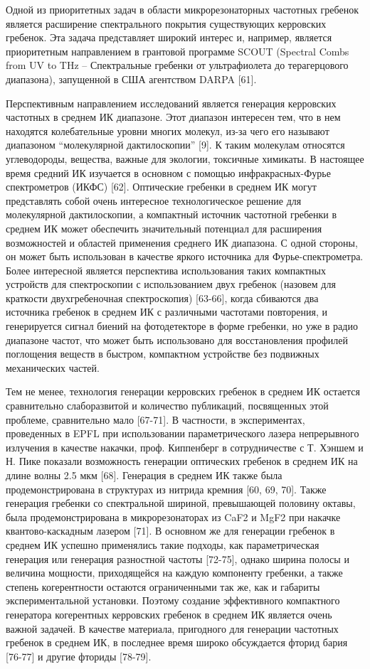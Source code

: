Одной из приоритетных задач в области микрорезонаторных частотных гребенок является расширение спектрального покрытия существующих керровских гребенок. Эта задача представляет широкий интерес и, например, является приоритетным направлением в грантовой программе SCOUT (Spectral Combs from UV to THz – Спектральные гребенки от ультрафиолета до терагерцового диапазона), запущенной в США агентством DARPA [61].


Перспективным направлением исследований является генерация керровских частотных в среднем ИК диапазоне. Этот диапазон интересен тем, что в нем находятся колебательные уровни многих молекул, из-за чего его называют диапазоном “молекулярной дактилоскопии” [9]. К таким молекулам относятся углеводороды, вещества, важные для экологии, токсичные химикаты. В настоящее время средний ИК изучается в основном с помощью инфракрасных-Фурье спектрометров (ИКФС) [62]. Оптические гребенки в среднем ИК могут представлять собой очень интересное технологическое решение для молекулярной дактилоскопии, а компактный источник частотной гребенки в среднем ИК может обеспечить значительный потенциал для расширения возможностей и областей применения среднего ИК диапазона. С одной стороны, он может быть использован в качестве яркого источника для Фурье-спектрометра. Более интересной является перспектива использования таких компактных устройств для спектроскопии с использованием двух гребенок (назовем для краткости двухгребеночная спектроскопия) [63-66], когда сбиваются два источника гребенок в среднем ИК с различными частотами повторения, и генерируется сигнал биений на фотодетекторе в форме гребенки, но уже в радио диапазоне частот, что может быть использовано для восстановления профилей поглощения веществ в быстром, компактном устройстве без подвижных механических частей.


Тем не менее, технология генерации керровских гребенок в среднем ИК остается сравнительно слаборазвитой и количество публикаций, посвященных этой проблеме, сравнительно мало [67-71]. В частности, в экспериментах, проведенных в EPFL при использовании параметрического лазера непрерывного излучения в качестве накачки, проф. Киппенберг в сотрудничестве с Т. Хэншем и Н. Пике показали возможность генерации оптических гребенок в среднем ИК на длине волны 2.5 мкм [68]. Генерация в среднем ИК также была продемонстрирована в структурах из нитрида кремния [60, 69, 70]. Также генерация гребенки со спектральной шириной, превышающей половину октавы, была продемонстрирована в микрорезонаторах из CaF2 и MgF2 при накачке квантово-каскадным лазером [71]. В основном же для генерации гребенок в среднем ИК успешно применялись такие подходы, как параметрическая генерация или генерация разностной частоты [72-75], однако ширина полосы и величина мощности, приходящейся на каждую компоненту гребенки, а также степень когерентности остаются ограниченными так же, как и габариты экспериментальной установки. Поэтому создание эффективного компактного генератора когерентных керровских гребенок в среднем ИК является очень важной задачей. В качестве материала, пригодного для генерации частотных гребенок в среднем ИК, в последнее время широко обсуждается фторид бария [76-77] и другие фториды [78-79].


